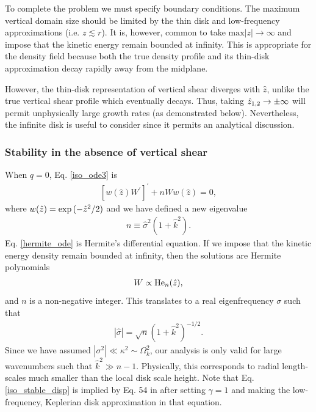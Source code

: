 To complete the problem we must specify boundary conditions. The 
maximum vertical domain size should be limited by the thin
disk and low-frequency approximations (i.e. $z\lesssim r$).     
It is, however, common to take $\mathrm{max}|z|\to\infty$ and impose
that the kinetic  energy remain bounded at infinity. This 
is appropriate for the density field because both the true density profile 
and its thin-disk approximation decay rapidly away from the midplane.   

However, the thin-disk representation of vertical shear diverges with 
$\hat{z}$, unlike the true vertical shear profile which eventually
decays. Thus, taking $\hat{z}_{1,2}\to \pm\infty$ will permit
unphysically large growth rates (as demonstrated below). Nevertheless,
the infinite disk is useful to consider since it permits an analytical
discussion.   

\subsubsection{Stability in the absence of vertical shear}\label{iso_stable}
When $q=0$, Eq. \ref{iso_ode3} is
\begin{align}\label{hermite_ode}
  \left[w(\hat{z})W^\prime \right]^\prime + nW
  w(\hat{z}) =0, 
\end{align}
where $w(\hat{z})=\exp{(-\hat{z}^2/2)}$ and we have defined a new eigenvalue 
\begin{align}
  n \equiv \hat{\sigma}^2(1+\hat{k}^2). 
\end{align} 
Eq. \ref{hermite_ode} is Hermite's differential equation. If we impose
that the kinetic energy density remain bounded at infinity, then the
solutions are Hermite polynomials  
\begin{align}
  W \propto \operatorname{He}_n(\hat{z}),
\end{align}
and $n$ is a non-negative integer. This translates to a real
eigenfrequency $\sigma$ such that
\begin{align}
  \left|\hat{\sigma}\right| = \sqrt{n}
  \left(1+\hat{k}^2\right)^{-1/2}. \label{iso_stable_disp}
\end{align}
Since we have assumed $|\sigma^2|\ll \kappa^2\sim \Omega_k^2$, our
analysis is only valid for large wavenumbers such that $\hat{k}^2\gg   
n-1$. Physically, this corresponds to radial length-scales much
smaller than the local disk scale height. Note that
Eq. \ref{iso_stable_disp} is implied by Eq. 54 in
\cite{lubow93} after setting $\gamma=1$ and making the low-frequency,
Keplerian disk approximation in that equation. 

